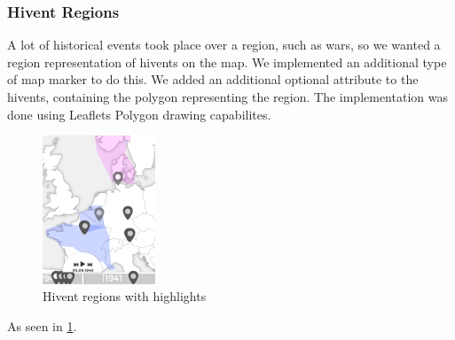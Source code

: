 \subsubsection{Hivent Regions}
A lot of historical events took place over a region, such as wars, so we wanted a region representation of hivents on the map.
We implemented an additional type of map marker to do this.
We added an additional optional attribute to the hivents, containing the polygon representing the region.
The implementation was done using Leaflets Polygon drawing capabilites.

  \begin{figure}[H]
\begin{center}
  \includegraphics[width=0.3\textwidth]{graphics/status2.png}
  \end{center}

  \caption{Hivent regions with highlights}
  \label{fig:hivent_region_highlight}
  \end{figure}

As seen in \ref{fig:hivent_region_highlight}. 





